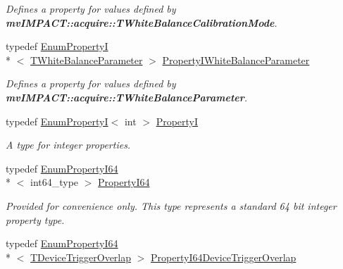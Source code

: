 \begin{DoxyCompactItemize}
\begin{DoxyCompactList}\small\item\em Defines a property for values defined by {\bfseries mv\+I\+M\+P\+A\+C\+T\+::acquire\+::\+T\+White\+Balance\+Calibration\+Mode}. \end{DoxyCompactList}\item 
\hypertarget{group___common_interface_gabdf739a9f4db49c6642a3bf50540a1b4}{typedef \hyperlink{classmv_i_m_p_a_c_t_1_1acquire_1_1_enum_property_i}{Enum\+Property\+I}\\*
$<$ \hyperlink{group___common_interface_ga7559c75a4eb1303c10ba8b611022d4c7}{T\+White\+Balance\+Parameter} $>$ \hyperlink{group___common_interface_gabdf739a9f4db49c6642a3bf50540a1b4}{Property\+I\+White\+Balance\+Parameter}}\label{group___common_interface_gabdf739a9f4db49c6642a3bf50540a1b4}

\begin{DoxyCompactList}\small\item\em Defines a property for values defined by {\bfseries mv\+I\+M\+P\+A\+C\+T\+::acquire\+::\+T\+White\+Balance\+Parameter}. \end{DoxyCompactList}\item 
typedef \hyperlink{classmv_i_m_p_a_c_t_1_1acquire_1_1_enum_property_i}{Enum\+Property\+I}$<$ int $>$ \hyperlink{group___common_interface_ga12d5e434238ca242a1ba4c6c3ea45780}{Property\+I}
\begin{DoxyCompactList}\small\item\em A type for integer properties. \end{DoxyCompactList}\item 
\hypertarget{group___common_interface_ga81749b2696755513663492664a18a893}{typedef \hyperlink{classmv_i_m_p_a_c_t_1_1acquire_1_1_enum_property_i64}{Enum\+Property\+I64}\\*
$<$ int64\+\_\+type $>$ \hyperlink{group___common_interface_ga81749b2696755513663492664a18a893}{Property\+I64}}\label{group___common_interface_ga81749b2696755513663492664a18a893}

\begin{DoxyCompactList}\small\item\em Provided for convenience only. This type represents a standard 64 bit integer property type. \end{DoxyCompactList}\item 
\hypertarget{group___common_interface_ga2fc921dda59fa054dbcb02f41ba4d423}{typedef \hyperlink{classmv_i_m_p_a_c_t_1_1acquire_1_1_enum_property_i64}{Enum\+Property\+I64}\\*
$<$ \hyperlink{group___device_specific_interface_gabad99a0fe37e0bf5302ece4fcdd8bbe2}{T\+Device\+Trigger\+Overlap} $>$ \hyperlink{group___common_interface_ga2fc921dda59fa054dbcb02f41ba4d423}{Property\+I64\+Device\+Trigger\+Overlap}}\label{group___common_interface_ga2fc921dda59fa054dbcb02f41ba4d423}


\end{DoxyCompactItemize}
